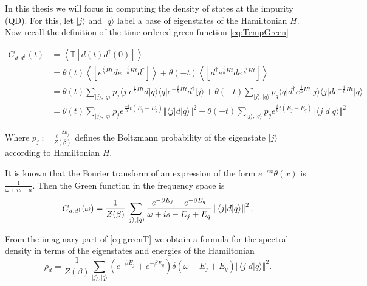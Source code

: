 
In this thesis we will focus in computing the density of states at the impurity (QD). For this, let $\vert j\rangle$ and $\vert q \rangle$ label a base of eigenstates of the Hamiltonian $H$. Now recall the definition of the time-ordered green function \ref{eq:TempGreen}

\begin{align}
G_{d,d^{\dagger}}(t)&=\left\langle \mathbb{T}\left[d(t)d^{\dagger}(0)\right]\right\rangle \\ \label{eq:MeanGreen}
&=\theta(t)\left\langle \left[e^{\frac{i}{\hbar}Ht}de^{-\frac{i}{\hbar}Ht}d^{\dagger}\right]\right\rangle +\theta(-t)\left\langle \left[d^{\dagger}e^{\frac{i}{\hbar}Ht}de^{\frac{-i}{\hbar}Ht}\right]\right\rangle \\
&=\theta(t)\sum_{\vert j\rangle,\vert q\rangle}p_{j}\langle j\vert e^{\frac{i}{\hbar}Ht}d\vert q\rangle\langle q\vert e^{-\frac{i}{\hbar}Ht}d^{\dagger}\vert j\rangle+\theta(-t)\sum_{\vert j\rangle,\vert q\rangle}p_{q}\langle q\vert d^{\dagger}e^{\frac{i}{\hbar}Ht}\vert j\rangle\langle j\vert de^{-\frac{i}{\hbar}Ht}\vert q\rangle\\
&=\theta(t)\sum_{\vert j\rangle,\vert q\rangle}p_{j}e^{\frac{-i}{\hbar}t\left(E_{j}-E_{q}\right)}\left\Vert \langle j\vert d\vert q\rangle\right\Vert ^{2}+\theta(-t)\sum_{\vert j\rangle,\vert q\rangle}p_{q}e^{\frac{i}{\hbar}t\left(E_{j}-E_{q}\right)}\left\Vert \langle j\vert d\vert q\rangle\right\Vert ^{2}
\end{align}

\noindent Where $p_{j}:=\frac{e^{-\beta E_{j}}}{Z(\beta)}$ defines the Boltzmann probability of the eigenstate $\vert j\rangle$ according to Hamiltonian $H$. 

It is known that the Fourier transform of an expression of the form ${\displaystyle e^{-ax}\theta(x)}$ is $\frac{1}{\omega+is-a}$. Then the Green function in the frequency space is 
\begin{equation}
G_{d,d^{\dagger}}(\omega)=\frac{1}{Z(\beta)}\sum_{\vert j\rangle,\vert q\rangle}{\displaystyle \frac{e^{-\beta E_{j}}+e^{-\beta E_{q}}}{\omega+is-E_{j}+E_{q}}}\left\Vert \langle j\vert d\vert q\rangle\right\Vert ^{2}
. \label{eq:greenT}
\end{equation}

\noindent From the imaginary part of \ref{eq:greenT} we obtain a formula for the spectral density in terms of the eigenstates and energies of the Hamiltonian 
\begin{equation}
\rho_{d}=\frac{1}{Z(\beta)}\sum_{\vert j\rangle,\vert q\rangle}{\displaystyle \left(e^{-\beta E_{j}}+e^{-\beta E_{q}} \right) \delta\left(\omega-E_{j}+E_{q} \right) } \left\Vert \langle j\vert d\vert q\rangle \right\Vert^{2}. \label{eq:DOSeigenstates}
\end{equation}

